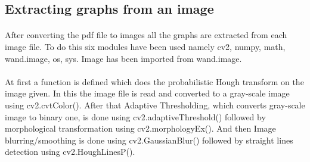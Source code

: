 \documentclass[a4paper,10pt]{scrreprt}
\begin{document}
\subsection{Extracting graphs from an image}
\paragraph{}
After converting the pdf file to images all the graphs are extracted from each image file. To do this six modules have been used namely cv2, numpy, math, wand.image, os, sys. Image has been imported from wand.image.
\paragraph{}
At first a function is defined which does the probabilistic Hough transform on the image given. In this the image file is read and converted to a gray-scale image using cv2.cvtColor(). After that Adaptive Thresholding, which converts gray-scale image to binary one, is done using cv2.adaptiveThreshold() followed by morphological transformation using cv2.morphologyEx(). And then Image blurring/smoothing is done using cv2.GaussianBlur() followed by straight lines detection using cv2.HoughLinesP().
\end{document}
